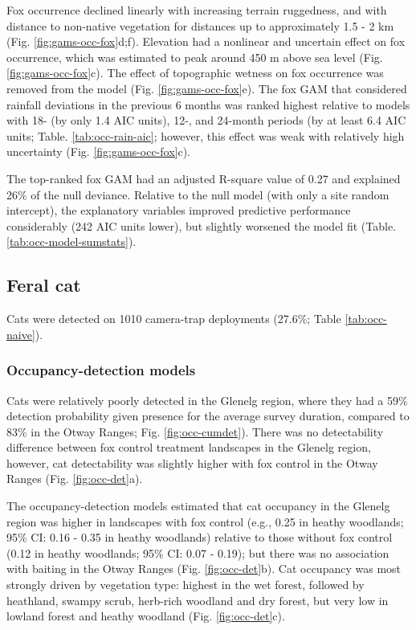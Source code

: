 \documentclass[]{elsarticle} %
\begin{document}
Fox occurrence declined linearly with increasing terrain ruggedness, and with distance to non-native vegetation for distances up to approximately 1.5 - 2 km (Fig. \ref{fig:gams-occ-fox}d;f). Elevation had a nonlinear and uncertain effect on fox occurrence, which was estimated to peak around 450 m above sea level (Fig. \ref{fig:gams-occ-fox}c). The effect of topographic wetness on fox occurrence was removed from the model (Fig. \ref{fig:gams-occ-fox}e). The fox GAM that considered rainfall deviations in the previous 6 months was ranked highest relative to models with 18- (by only 1.4 AIC units), 12-, and 24-month periods (by at least 6.4 AIC units; Table. \ref{tab:occ-rain-aic}; however, this effect was weak with relatively high uncertainty (Fig. \ref{fig:gams-occ-fox}c).

The top-ranked fox GAM had an adjusted R-square value of 0.27 and explained 26\% of the null deviance. Relative to the null model (with only a site random intercept), the explanatory variables improved predictive performance considerably (242 AIC units lower), but slightly worsened the model fit (Table. \ref{tab:occ-model-sumstats}).

\hypertarget{feral-cat}{%
\subsection{Feral cat}\label{feral-cat}}

Cats were detected on 1010 camera-trap deployments (27.6\%; Table \ref{tab:occ-naive}).

\hypertarget{occupancy-detection-models-2}{%
\subsubsection{Occupancy-detection models}\label{occupancy-detection-models-2}}

Cats were relatively poorly detected in the Glenelg region, where they had a 59\% detection probability given presence for the average survey duration, compared to 83\% in the Otway Ranges; Fig. \ref{fig:occ-cumdet}). There was no detectability difference between fox control treatment landscapes in the Glenelg region, however, cat detectability was slightly higher with fox control in the Otway Ranges (Fig. \ref{fig:occ-det}a).

The occupancy-detection models estimated that cat occupancy in the Glenelg region was higher in landscapes with fox control (e.g., 0.25 in heathy woodlands; 95\% CI: 0.16 - 0.35 in heathy woodlands) relative to those without fox control (0.12 in heathy woodlands; 95\% CI: 0.07 - 0.19); but there was no association with baiting in the Otway Ranges (Fig. \ref{fig:occ-det}b). Cat occupancy was most strongly driven by vegetation type: highest in the wet forest, followed by heathland, swampy scrub, herb-rich woodland and dry forest, but very low in lowland forest and heathy woodland (Fig. \ref{fig:occ-det}c).
\end{document}
